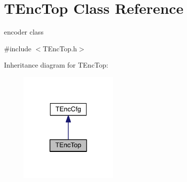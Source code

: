 \hypertarget{class_t_enc_top}{}\section{T\+Enc\+Top Class Reference}
\label{class_t_enc_top}


encoder class  




{\ttfamily \#include $<$T\+Enc\+Top.\+h$>$}



Inheritance diagram for T\+Enc\+Top\+:
\nopagebreak
\begin{figure}[H]
\begin{center}
\leavevmode
\includegraphics[width=135pt]{db/dbb/class_t_enc_top__inherit__graph}
\end{center}
\end{figure}



